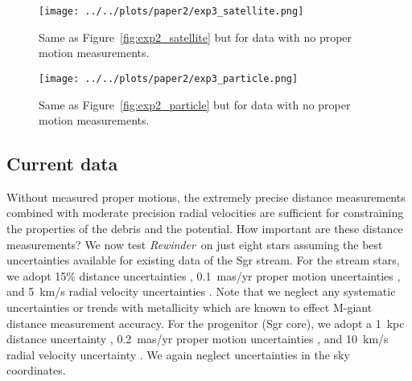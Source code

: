 \documentclass[letterpaper,12pt,preprint]{aastex}
\newcommand{\rewinder}{\emph{Rewinder}}
\begin{document}
\begin{figure}[!ht]
\begin{center}
\texttt{[image: ../../plots/paper2/exp3\_satellite.png]}
\caption{ Same as Figure~\ref{fig:exp2_satellite} but for data with no proper motion measurements.  }\label{fig:exp3_satellite}
\end{center}
\end{figure}

\begin{figure}[!ht]
\begin{center}
\texttt{[image: ../../plots/paper2/exp3\_particle.png]}
\caption{ Same as Figure~\ref{fig:exp2_particle} but for data with no proper motion measurements.  }\label{fig:exp3_particle}
\end{center}
\end{figure}

\subsection{Current data}\label{sec:exp4}
Without measured proper motions, the extremely precise distance measurements combined with moderate precision radial velocities are sufficient for constraining the properties of the debris and the potential. How important are these distance measurements? We now test \rewinder\ on just eight stars assuming the best uncertainties available for existing data of the Sgr stream. For the stream stars, we adopt 15\% distance uncertainties \citep[typical for M-giants, e.g.,][]{majewski04}, 0.1~mas/yr proper motion uncertainties \citep{koposov13}, and 5~km/s radial velocity uncertainties \citep{majewski04}. Note that we neglect any systematic uncertainties or trends with metallicity which are known to effect M-giant distance measurement accuracy. For the progenitor (Sgr core), we adopt a 1~kpc distance uncertainty \citep{kunder09}, 0.2~mas/yr proper motion uncertainties \citep{pryor10}, and 10~km/s radial velocity uncertainty \citep{frinchaboy12}. We again neglect uncertainties in the sky coordinates.
\end{document}
